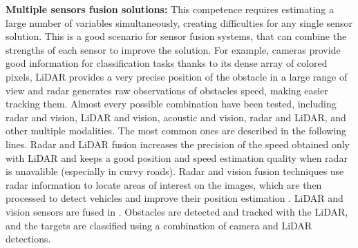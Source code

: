
\textbf{Multiple sensors fusion solutions:}
This competence requires estimating a large number of variables simultaneously,
creating difficulties for any single sensor solution. This is a good scenario
for sensor fusion systems, that can combine the strengths of each sensor to
improve the solution. For example, cameras provide good information 
for classification tasks thanks to its dense array of colored pixels, LiDAR 
provides a very precise position of the obstacle in a large range of view and 
radar generates raw observations of obstacles speed, making easier tracking 
them.
Almost every possible combination have been tested, including radar and vision, 
LiDAR and vision, acoustic and vision, radar and LiDAR, and other multiple 
modalities. The most common ones are described in the following lines.
Radar and LiDAR fusion \cite{gohring2011radar} increases the precision of 
the speed obtained only with LiDAR and keeps a good position and speed 
estimation quality when radar is unavalible (especially in curvy roads).
Radar and vision fusion techniques use radar information to locate areas of 
interest on the images, which are then processed to detect vehicles and improve 
their position estimation \cite{alessandretti2007vehicle}.
LiDAR and vision sensors are fused in \cite{premebida2007lidar}. Obstacles
are detected and tracked with the LiDAR, and the targets are classified using
a combination of camera and LiDAR detections.

